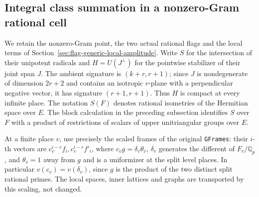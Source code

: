 \subsection{Integral class summation in a nonzero-Gram rational cell}
\label{sec:flag-generic-global-classes}

We retain the nonzero-Gram point, the two actual rational flags and
the local terms of Section~\ref{sec:flag-generic-local-amplitude}.
Write \(S\) for the intersection of their unipotent radicals and
\(H=U(J^\perp)\) for the pointwise stabilizer of their joint span \(J\).
The ambient signature is \((k+r,r+1)\); since \(J\) is nondegenerate
of dimension \(2r+2\) and contains an isotropic \(r\)-plane with a
perpendicular negative vector, it has signature \((r+1,r+1)\).
Thus \(H\) is compact at every infinite place. The notation \(S(F)\)
denotes rational isometries of the Hermitian space over \(E\).
The block calculation in the preceding subsection identifies \(S\)
over \(F\) with a product of restrictions of scalars of upper
unitriangular groups over \(E\).

At a finite place \(v\), use precisely the scaled frames of the
original \texttt{GFrames}: their \(i\)-th vectors are
\(c_v^{i-r}f_i,c_v^{i-r}f'_i\), where
\(c_vg=\delta_v\theta_v\), \(\delta_v\) generates the different of
\(F_v/\mathbb Q_p\), and \(\theta_v=1\) away from \(g\) and is a
uniformizer at the split level places. In particular
\(v(c_v)=v(\delta_v)\), since \(g\) is the product of the two
distinct split rational primes. The local spaces, inner lattices
and graphs are transported by this scaling, not changed.

